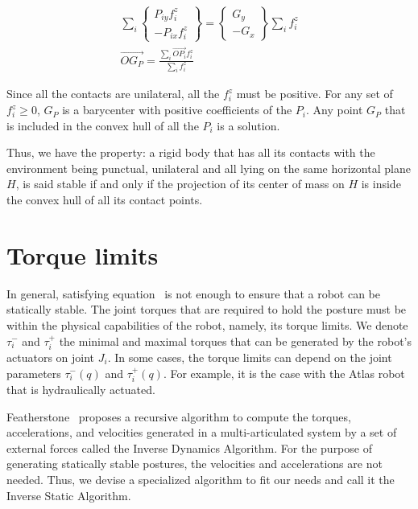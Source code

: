\begin{align}
\sum\limits_i \left\{\begin{array}{r} P_{iy}f_i^z\\-P_{ix}f_i^z\end{array}\right\}
= \left\{\begin{array}{r} G_{y}\\-G_{x}\end{array}\right\} \sum\limits_i f_i^z\\
  \overrightarrow{OG_P} = \frac{\sum\limits_i \overrightarrow{OP_i} f_i^z}{\sum\limits_i f_i^z}
\end{align}

Since all the contacts are unilateral, all the $f_i^z$ must be positive.
For any set of $f_i^z\geq0$, $G_P$ is a barycenter with positive coefficients of the $P_i$.
Any point $G_P$ that is included in the convex hull of all the $P_i$ is a solution.

Thus, we have the property: a rigid body that has all its contacts with the environment being punctual, unilateral and all lying on the same horizontal plane $H$, is said stable if and only if the projection of its center of mass on $H$ is inside the convex hull of all its contact points.



\section{Torque limits}
\label{sec:torque_limits}


In general, satisfying equation~ is not enough to ensure that a robot can be statically stable.
The joint torques that are required to hold the posture must be within the physical capabilities of the robot, namely, its torque limits.
We denote $\tau_i^-$ and $\tau_i^+$ the minimal and maximal torques that can be generated by the robot's actuators on joint $J_i$.
In some cases, the torque limits can depend on the joint parameters $\tau_i^-(q)$ and $\tau_i^+(q)$.
For example, it is the case with the Atlas robot that is hydraulically actuated.

Featherstone~\cite{featherstone:book:2007} proposes a recursive algorithm to compute the torques, accelerations, and velocities generated in a multi-articulated system by a set of external forces called the Inverse Dynamics Algorithm.
For the purpose of generating statically stable postures, the velocities and accelerations are not needed.
Thus, we devise a specialized algorithm to fit our needs and call it the Inverse Static Algorithm.

